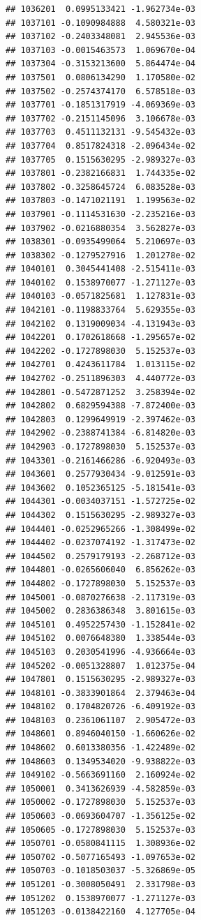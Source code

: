 \documentclass[ignorenonframetext,]{beamer}
\begin{document}
\begin{frame}[fragile]
\begin{verbatim}
## 1036201  0.0995133421 -1.962734e-03
## 1037101 -0.1090984888  4.580321e-03
## 1037102 -0.2403348081  2.945536e-03
## 1037103 -0.0015463573  1.069670e-04
## 1037304 -0.3153213600  5.864474e-04
## 1037501  0.0806134290  1.170580e-02
## 1037502 -0.2574374170  6.578518e-03
## 1037701 -0.1851317919 -4.069369e-03
## 1037702 -0.2151145096  3.106678e-03
## 1037703  0.4511132131 -9.545432e-03
## 1037704  0.8517824318 -2.096434e-02
## 1037705  0.1515630295 -2.989327e-03
## 1037801 -0.2382166831  1.744335e-02
## 1037802 -0.3258645724  6.083528e-03
## 1037803 -0.1471021191  1.199563e-02
## 1037901 -0.1114531630 -2.235216e-03
## 1037902 -0.0216880354  3.562827e-03
## 1038301 -0.0935499064  5.210697e-03
## 1038302 -0.1279527916  1.201278e-02
## 1040101  0.3045441408 -2.515411e-03
## 1040102  0.1538970077 -1.271127e-03
## 1040103 -0.0571825681  1.127831e-03
## 1042101 -0.1198833764  5.629355e-03
## 1042102  0.1319009034 -4.131943e-03
## 1042201  0.1702618668 -1.295657e-02
## 1042202 -0.1727898030  5.152537e-03
## 1042701  0.4243611784  1.013115e-02
## 1042702 -0.2511896303  4.440772e-03
## 1042801 -0.5472871252  3.258394e-02
## 1042802  0.6829594388 -7.872400e-03
## 1042803  0.1299649919 -2.397462e-03
## 1042902 -0.2388741384 -6.814820e-03
## 1042903 -0.1727898030  5.152537e-03
## 1043301 -0.2161466286 -6.920493e-03
## 1043601  0.2577930434 -9.012591e-03
## 1043602  0.1052365125 -5.181541e-03
## 1044301 -0.0034037151 -1.572725e-02
## 1044302  0.1515630295 -2.989327e-03
## 1044401 -0.0252965266 -1.308499e-02
## 1044402 -0.0237074192 -1.317473e-02
## 1044502  0.2579179193 -2.268712e-03
## 1044801 -0.0265606040  6.856262e-03
## 1044802 -0.1727898030  5.152537e-03
## 1045001 -0.0870276638 -2.117319e-03
## 1045002  0.2836386348  3.801615e-03
## 1045101  0.4952257430 -1.152841e-02
## 1045102  0.0076648380  1.338544e-03
## 1045103  0.2030541996 -4.936664e-03
## 1045202 -0.0051328807  1.012375e-04
## 1047801  0.1515630295 -2.989327e-03
## 1048101 -0.3833901864  2.379463e-04
## 1048102  0.1704820726 -6.409192e-03
## 1048103  0.2361061107  2.905472e-03
## 1048601  0.8946040150 -1.660626e-02
## 1048602  0.6013380356 -1.422489e-02
## 1048603  0.1349534020 -9.938822e-03
## 1049102 -0.5663691160  2.160924e-02
## 1050001  0.3413626939 -4.582859e-03
## 1050002 -0.1727898030  5.152537e-03
## 1050603 -0.0693604707 -1.356125e-02
## 1050605 -0.1727898030  5.152537e-03
## 1050701 -0.0580841115  1.308936e-02
## 1050702 -0.5077165493 -1.097653e-02
## 1050703 -0.1018503037 -5.326869e-05
## 1051201 -0.3008050491  2.331798e-03
## 1051202  0.1538970077 -1.271127e-03
## 1051203 -0.0138422160  4.127705e-04

\end{verbatim}
\end{frame}
\end{document}
